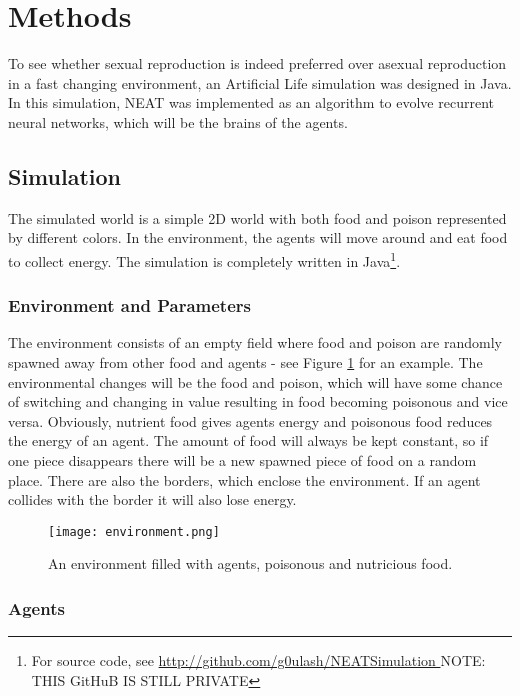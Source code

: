 \section{Methods}

To see whether sexual reproduction is indeed preferred over asexual reproduction in a fast changing environment, an Artificial Life simulation was designed in Java. In this simulation, NEAT was implemented as an algorithm to evolve recurrent neural networks, which will be the brains of the agents.

\subsection{Simulation}

The simulated world is a simple 2D world with both food and poison represented by different colors.
In the environment, the agents will move around and eat food to collect energy.
The simulation is completely written in Java\footnote{For source code, see \url{http://github.com/g0ulash/NEATSimulation } NOTE: THIS GitHuB IS STILL PRIVATE}.

\subsubsection{Environment and Parameters}

The environment consists of an empty field where food and poison are randomly spawned away from other food and agents - see Figure \ref{fig:env} for an example.
The environmental changes will be the food and poison, which will have some chance of switching and changing in value resulting in food becoming poisonous and vice versa.
Obviously, nutrient food gives agents energy and poisonous food reduces the energy of an agent.
The amount of food will always be kept constant, so if one piece disappears there will be a new spawned piece of food on a random place.
There are also the borders, which enclose the environment.
If an agent collides with the border it will also lose energy.

\begin{figure}[H]
\centering
\texttt{[image: environment.png]}
\caption{An environment filled with agents, poisonous and nutricious food.}
\label{fig:env}
\end{figure}

\subsubsection{Agents}


